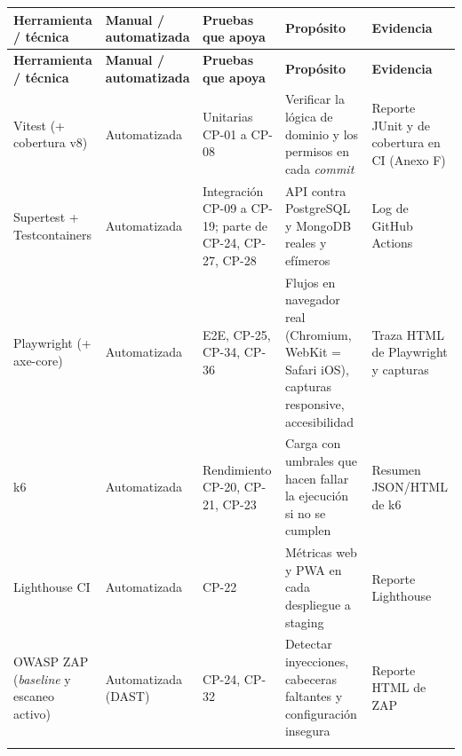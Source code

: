 \documentclass[11pt,a4paper]{article}
\begin{document}
\begingroup\small
\begin{longtable}{@{}>{\raggedright\arraybackslash\hspace{0pt}}p{}>{\raggedright\arraybackslash\hspace{0pt}}p{}>{\raggedright\arraybackslash\hspace{0pt}}p{}>{\raggedright\arraybackslash\hspace{0pt}}p{}>{\raggedright\arraybackslash\hspace{0pt}}p{}@{}}
\toprule
\textbf{Herramienta / técnica} & \textbf{Manual / automatizada} & \textbf{Pruebas que apoya} & \textbf{Propósito} & \textbf{Evidencia} \\ \midrule
\endfirsthead
\toprule
\textbf{Herramienta / técnica} & \textbf{Manual / automatizada} & \textbf{Pruebas que apoya} & \textbf{Propósito} & \textbf{Evidencia} \\ \midrule
\endhead
\bottomrule
\endlastfoot
Vitest (+ cobertura v8) & \mbox{Automatizada} & Unitarias \mbox{CP-01} a \mbox{CP-08} & Verificar la lógica de dominio y los permisos en cada \textit{commit} & Reporte JUnit y de cobertura en CI (Anexo F) \\ \addlinespace[0.25em]
Supertest + Testcontainers & \mbox{Automatizada} & Integración \mbox{CP-09} a \mbox{CP-19}; parte de \mbox{CP-24}, \mbox{CP-27}, \mbox{CP-28} & API contra PostgreSQL y MongoDB reales y efímeros & Log de GitHub Actions \\ \addlinespace[0.25em]
Playwright (+ axe-core) & \mbox{Automatizada} & E2E, \mbox{CP-25}, \mbox{CP-34}, \mbox{CP-36} & Flujos en navegador real (Chromium, WebKit = Safari iOS), capturas responsive, accesibilidad & Traza HTML de Playwright y capturas \\ \addlinespace[0.25em]
\mbox{k6} & \mbox{Automatizada} & Rendimiento \mbox{CP-20}, \mbox{CP-21}, \mbox{CP-23} & Carga con umbrales que hacen fallar la ejecución si no se cumplen & Resumen JSON/HTML de k6 \\ \addlinespace[0.25em]
Lighthouse CI & \mbox{Automatizada} & \mbox{CP-22} & Métricas web y PWA en cada despliegue a staging & Reporte Lighthouse \\ \addlinespace[0.25em]
OWASP ZAP (\textit{baseline} y escaneo activo) & Automatizada (DAST) & \mbox{CP-24}, \mbox{CP-32} & Detectar inyecciones, cabeceras faltantes y configuración insegura & Reporte HTML de ZAP \\ \addlinespace[0.25em]

\end{longtable}
\end{document}
